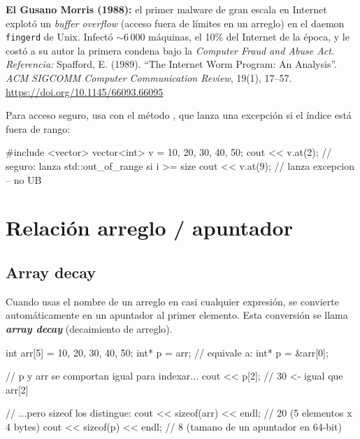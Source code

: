 \documentclass[12pt, oneside]{article}
\begin{document}
\begin{tecnico}
  \textbf{El Gusano Morris (1988):} el primer malware de gran escala en
  Internet explotó un \textit{buffer overflow} (acceso fuera de límites en un
  arreglo) en el daemon \texttt{fingerd} de Unix. Infectó $\sim$6\,000
  máquinas, el 10\% del Internet de la época, y le costó a su autor la primera
  condena bajo la \textit{Computer Fraud and Abuse Act}.\\
  \textit{Referencia:} Spafford, E. (1989). ``The Internet Worm Program: An
  Analysis''. \textit{ACM SIGCOMM Computer Communication Review}, 19(1),
  17--57. \url{https://doi.org/10.1145/66093.66095}
\end{tecnico}

Para acceso seguro, usa  con el método , que
lanza una excepción si el índice está fuera de rango:

\begin{codigo}
#include <vector>
vector<int> v = {10, 20, 30, 40, 50};
cout << v.at(2);   // seguro: lanza std::out_of_range si i >= size
cout << v.at(9);   // lanza excepcion -- no UB
\end{codigo}

\section{Relación arreglo / apuntador}

\subsection{Array decay}

Cuando usas el nombre de un arreglo en casi cualquier expresión, se convierte
automáticamente en un apuntador al primer elemento. Esta conversión se llama
\textbf{\textit{array decay}} (decaimiento de arreglo).

\begin{codigo}
int arr[5] = {10, 20, 30, 40, 50};
int* p = arr;   // equivale a: int* p = &arr[0];

// p y arr se comportan igual para indexar...
cout << p[2];   // 30  <- igual que arr[2]

// ...pero sizeof los distingue:
cout << sizeof(arr) << endl;  // 20  (5 elementos x 4 bytes)
cout << sizeof(p)   << endl;  //  8  (tamano de un apuntador en 64-bit)
\end{codigo}
\end{document}
